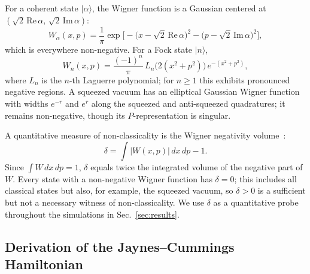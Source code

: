 \documentclass{iopjournal}
\begin{document}
For a coherent state $|\alpha\rangle$, the Wigner function is a Gaussian centered at $(\sqrt{2}\,\text{Re}\,\alpha,\, \sqrt{2}\,\text{Im}\,\alpha)$:
\begin{equation}
W_\alpha(x,p) = \frac{1}{\pi} \exp\!\Big[-\big(x - \sqrt{2}\,\text{Re}\,\alpha\big)^2 - \big(p - \sqrt{2}\,\text{Im}\,\alpha\big)^2\Big],
\label{eq:wigner_coherent}
\end{equation}
which is everywhere non-negative. For a Fock state $|n\rangle$,
\begin{equation}
W_n(x,p) = \frac{(-1)^n}{\pi} \, L_n\!\big(2(x^2 + p^2)\big) \, e^{-(x^2 + p^2)},
\label{eq:wigner_fock}
\end{equation}
where $L_n$ is the $n$-th Laguerre polynomial; for $n \geq 1$ this exhibits pronounced negative regions. A squeezed vacuum has an elliptical Gaussian Wigner function with widths $e^{-r}$ and $e^{r}$ along the squeezed and anti-squeezed quadratures; it remains non-negative, though its $P$-representation is singular.

A quantitative measure of non-classicality is the Wigner negativity volume~\cite{kenfack2004}:
\begin{equation}
\delta = \int \big|W(x,p)\big| \, dx\, dp - 1.
\label{eq:negativity}
\end{equation}
Since $\int W\,dx\,dp = 1$, $\delta$ equals twice the integrated volume of the negative part of $W$. Every state with a non-negative Wigner function has $\delta = 0$; this includes all classical states but also, for example, the squeezed vacuum, so $\delta > 0$ is a sufficient but not a necessary witness of non-classicality. We use $\delta$ as a quantitative probe throughout the simulations in Sec.~\ref{sec:results}.


\subsection{Derivation of the Jaynes--Cummings Hamiltonian}
\label{sec:jcm}
\end{document}
